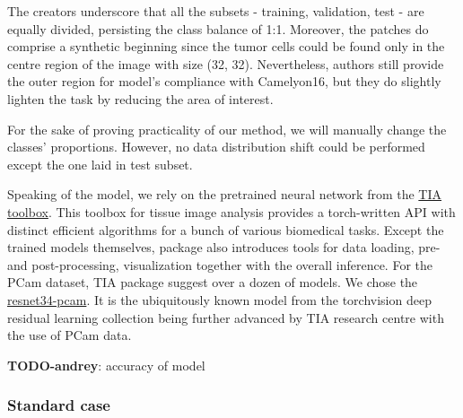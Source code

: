 \documentclass{article}
\newcommand{\todo}[2]{{\color{red} {\bf TODO-#1}: #2}}
\begin{document}
The creators underscore that all the subsets - training, validation, test - are equally divided, persisting the class balance of 1:1. Moreover, the patches do comprise a synthetic beginning since the tumor cells could be found only in the centre region of the image with size (32, 32). Nevertheless, authors still provide the outer region for model's compliance with Camelyon16, but they do slightly lighten the task by reducing the area of interest.

For the sake of proving practicality of our method, we will manually change the classes' proportions. However, no data distribution shift could be performed except the one laid in test subset.

Speaking of the model, we rely on the pretrained neural network from the \href{https://tiatoolbox.readthedocs.io}{TIA toolbox}. This toolbox for tissue image analysis provides a torch-written API with distinct efficient algorithms for a bunch of various biomedical tasks. Except the trained models themselves, package also introduces tools for data loading, pre- and post-processing, visualization together with the overall inference. For the PCam dataset, TIA package suggest over a dozen of models. We chose the \href{https://huggingface.co/1aurent/resnet34.tiatoolbox-pcam}{resnet34-pcam}. It is the ubiquitously known model from the torchvision deep residual learning collection being further advanced by TIA research centre with the use of PCam data.

\todo{andrey}{accuracy of model}

\subsubsection{Standard case}
\end{document}

